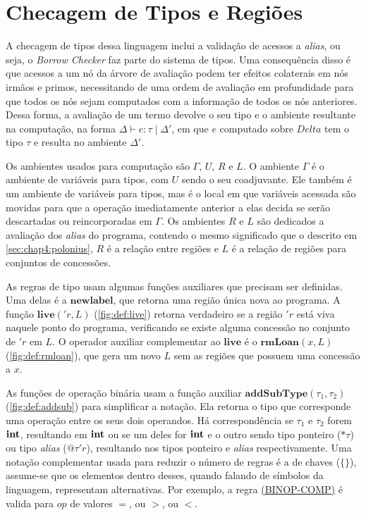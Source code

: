 \section{Checagem de Tipos e Regiões}

A checagem de tipos dessa linguagem inclui a validação de acessos a \emph{alias}, ou seja, o \emph{Borrow Checker} faz parte do sistema de tipos. Uma consequência disso é que acessos a um nó da árvore de avaliação podem ter efeitos colaterais em nós irmãos e primos, necessitando de uma ordem de avaliação em profundidade para que todos os nós sejam computados com a informação de todos os nós anteriores. Dessa forma, a avaliação de um termo devolve o seu tipo e o ambiente resultante na computação, na forma $\Delta \vdash e : \tau\;|\;\Delta'$, em que $e$ computado sobre $Delta$ tem o tipo $\tau$ e resulta no ambiente $\Delta'$.

Os ambientes usados para computação são $\Gamma$, $U$, $R$ e $L$. O ambiente $\Gamma$ é o ambiente de variáveis para tipos, com $U$ sendo o seu coadjuvante. Ele também é um ambiente de variáveis para tipos, mas é o local em que variáveis acessada são movidas para que a operação imediatamente anterior a elas decida se serão descartadas ou reincorporadas em $\Gamma$. Os ambientes $R$ e $L$ são dedicados a avaliação dos \emph{alias} do programa, contendo o mesmo significado que o descrito em \ref{sec:chap4:polonius}, $R$ é a relação entre regiões e $L$ é a relação de regiões para conjuntos de concessões. 

As regras de tipo usam algumas funções auxiliares que precisam ser definidas. Uma delas é a $\mathbf{newlabel}$, que retorna uma região única nova ao programa. A função $\mathbf{live}('r, L)$ (\ref{fig:def:live}) retorna verdadeiro se a região $'r$ está viva naquele ponto do programa, verificando se existe alguma concessão no conjunto de $'r$ em $L$. O operador auxiliar complementar ao $\mathbf{live}$ é o $\mathbf{rmLoan}(x, L)$ (\ref{fig:def:rmloan}), que gera um novo $L$ sem as regiões que possuem uma concessão a $x$.

As funções de operação binária usam a função auxiliar $\mathbf{addSubType}(\tau_1, \tau_2)$ (\ref{fig:def:addsub}) para simplificar a notação. Ela retorna o tipo que corresponde uma operação entre os seus dois operandos. Há correspondência se $\tau_1$ e $\tau_2$ forem $\mathbf{int}$, resultando em $\mathbf{int}$ ou se um deles for $\mathbf{int}$ e o outro sendo tipo ponteiro ($\text{*}\!\tau$) ou tipo \emph{alias} ($@\tau'r$), resultando nos tipos ponteiro e \emph{alias} respectivamente. Uma notação complementar usada para reduzir o número de regras é a de chaves ($\{\}$), assume-se que os elementos dentro desses, quando falando de símbolos da linguagem, representam alternativas. Por exemplo, a regra \hyperref[trule:binop-comp]{(BINOP-COMP)} é valida para $op$ de valores $=$, ou $>$, ou $<$.

